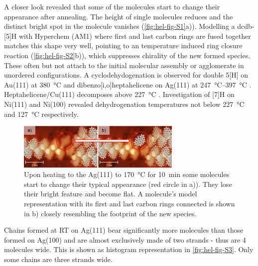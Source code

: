 A closer look revealed that some of the molecules start to change their appearance after annealing.  The height of single molecules reduces and the distinct bright spot in the molecule vanishes (\autoref{fig:hel-fig-S1}a)). Modelling a dcdb-[5]H with Hyperchem (AM1) where first and last carbon rings are fused together matches this shape very well, pointing to an temperature induced ring closure reaction (\autoref{fig:hel-fig-S2}b)), which suppresses chirality of the new formed species. These often but not attach to the initial molecular assembly or agglomerate in unordered configurations. A cyclodehydogenation is observed for double 5[H] on Au(111) at \SI{380}{\celsius} \cite{Wang_Heteroatom-doped_2017} and dibenzo[i,o]heptahelicene on Ag(111) at \SIrange{247}{397}{\celsius} \cite{Stetsovych_helical_2016}. Heptahelicene/Cu(111) decomposes above \SI{227}{\celsius} \cite{Ernst_two-dimensional_2001}. Investigation of [7]H on Ni(111) and Ni(100) revealed dehydrogenation temperatures not below \SI{227}{\celsius} and \SI{127}{\celsius} respectively.\cite{Ernst_Adsorption_2003}

\begin{figure} \centering
	\includegraphics[width=0.7\textwidth]{./images/paper/helicene/fig-S2}
	\caption{Upon heating to the Ag(111) to \SI{170}{\celsius} for \SI{10}{\minute} some molecules start to change their typical appearance (red circle in a)). They lose their bright feature and become flat. A molecule’s model representation with its first and last carbon rings connected is shown in b) closely resembling the footprint of the new species.}
	\label{fig:hel-fig-S2}
\end{figure}

Chains formed at RT on Ag(111) bear significantly more molecules than those formed on Ag(100) and are almost exclusively made of two strands - thus are 4 molecules wide. This is shown as histogram representation in \autoref{fig:hel-fig-S3}. Only some chains are three strands wide.

